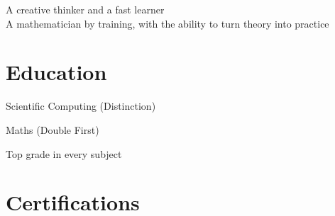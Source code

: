 \documentclass[a4paper]{custom-resume}
\begin{document}

\lastupdated



\vfill

\center
A creative thinker and a fast learner \\
A mathematician by training, with the ability to turn theory into practice

\vfill


\begin{minipage}[t][0.8\textheight]{0.33\textwidth}


\section{Education}

 \vspace{2pt}
Scientific Computing (Distinction)

\sectionspace

 \vspace{2pt}
Maths (Double First) \\ \vspace{2pt}

\sectionspace

 \vspace{2pt}
Top grade in every subject\\ \vspace{2pt}

\vfill


\section{Certifications}


\sectionspace


\end{minipage}
\end{document}
